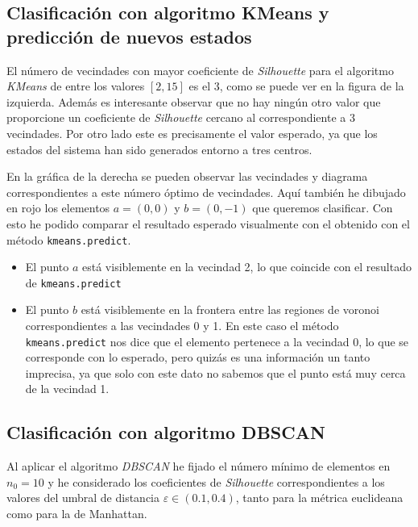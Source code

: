 \documentclass[10pt, spanish]{article}
\theoremstyle{definition}
\theoremstyle{break}
\begin{document}
\subsection{Clasificación con algoritmo KMeans y predicción de nuevos estados}

El número de vecindades con mayor coeficiente de \textit{Silhouette} para el algoritmo
\textit{KMeans} de entre los valores $[2,15]$ es el 3, como se puede ver en la
figura de la izquierda. Además es interesante observar que no hay ningún otro
valor que proporcione un coeficiente de \textit{Silhouette} cercano al correspondiente a
3 vecindades.  Por otro lado este es precisamente el valor esperado, ya que los
estados del sistema han sido generados entorno a tres centros.

En la gráfica de la derecha se pueden observar las vecindades y diagrama
correspondientes a este número óptimo de vecindades. Aquí también he dibujado en
rojo los elementos $a=(0,0)$ y $b=(0,-1)$ que queremos clasificar. Con esto he
podido comparar el resultado esperado visualmente con el obtenido con el método
\texttt{kmeans.predict}.
\begin{itemize}
\setlength\itemsep{0em}
    \item El punto $a$ está visiblemente en la vecindad 2, lo que coincide con
        el resultado de  \texttt{kmeans.predict} 
    \item El punto $b$ está visiblemente en la frontera entre las regiones de
voronoi correspondientes a las vecindades 0 y 1. En este caso el método
\texttt{kmeans.predict} nos dice que el elemento pertenece a la vecindad 0, lo
que se corresponde con lo esperado, pero quizás es una información un tanto
imprecisa, ya que solo con este dato no sabemos que el punto está muy cerca de
la vecindad 1.  \end{itemize}

\vspace{-1em}

\begin{center}
    \makebox[\textwidth][c]{\scalebox{0.65}{}}
\end{center}

\subsection{Clasificación con algoritmo DBSCAN}

Al aplicar el algoritmo \textit{DBSCAN} he fijado el número mínimo de elementos
en $n_0=10$ y he considerado los coeficientes de \textit{Silhouette} correspondientes a
los valores del umbral de distancia $\varepsilon\in(0.1, 0.4)$, tanto para la
métrica euclideana como para la de Manhattan.
\end{document}
